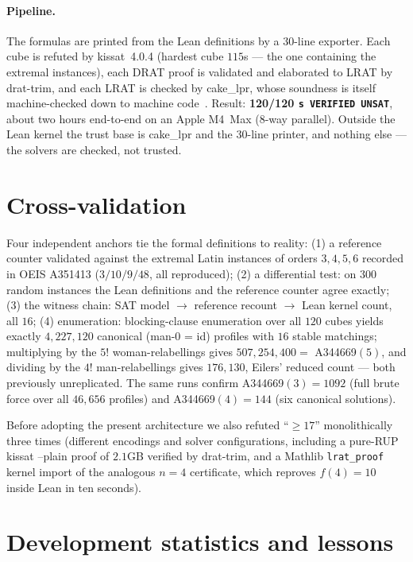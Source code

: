 \documentclass[11pt]{article}
\begin{document}
\paragraph{Pipeline.} The formulas are printed from the Lean definitions by a $30$-line
exporter. Each cube is refuted by \textsf{kissat}~4.0.4 (hardest cube $115$s --- the one
containing the extremal instances), each DRAT proof is validated and elaborated to LRAT by
\textsf{drat-trim}, and each LRAT is checked by \textsf{cake\_lpr}, whose soundness is itself
machine-checked down to machine code~\cite{cakelpr}. Result: \textbf{120/120
\texttt{s VERIFIED UNSAT}}, about two hours end-to-end on an Apple M4~Max (8-way parallel).
Outside the Lean kernel the trust base is \textsf{cake\_lpr} and the $30$-line printer, and
nothing else --- the solvers are checked, not trusted.

\section{Cross-validation}

Four independent anchors tie the formal definitions to reality:
(1) a reference counter validated against the extremal Latin instances of orders $3,4,5,6$
recorded in OEIS A351413 ($3/10/9/48$, all reproduced);
(2) a differential test: on $300$ random instances the Lean definitions and the reference
counter agree exactly;
(3) the witness chain: SAT model $\to$ reference recount $\to$ Lean kernel count, all $16$;
(4) enumeration: blocking-clause enumeration over all $120$ cubes yields exactly
$4{,}227{,}120$ canonical (man-$0$ = id) profiles with $16$ stable matchings; multiplying by the
$5!$ woman-relabellings gives $507{,}254{,}400 = $ A344669$(5)$, and dividing by the $4!$
man-relabellings gives $176{,}130$, Eilers' reduced count --- both previously unreplicated. The
same runs confirm A344669$(3) = 1092$ (full brute force over all $46{,}656$ profiles) and
A344669$(4) = 144$ (six canonical solutions).

Before adopting the present architecture we also refuted ``$\ge 17$'' monolithically three
times (different encodings and solver configurations, including a pure-RUP
\textsf{kissat --plain} proof of $2.1$GB verified by \textsf{drat-trim}, and a Mathlib
\texttt{lrat\_proof} kernel import of the analogous $n{=}4$ certificate, which reproves
$f(4)=10$ inside Lean in ten seconds).


\section{Development statistics and lessons}\label{sec:lessons}
\end{document}

